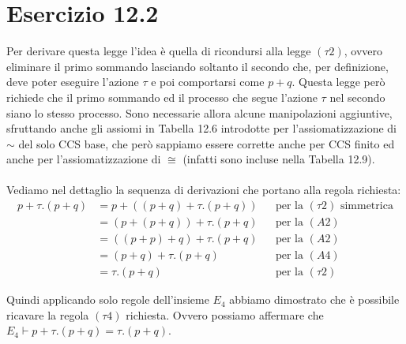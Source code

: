 \section*{Esercizio 12.2}

    
    Per derivare questa legge l'idea è quella di ricondursi alla legge $(\tau 2)$, ovvero eliminare il primo sommando lasciando soltanto il secondo che, per definizione, deve poter eseguire l'azione $\tau$ e poi comportarsi come $p+q$. Questa legge però richiede che il primo sommando ed il processo che segue l'azione $\tau$ nel secondo siano lo stesso processo. Sono necessarie allora alcune manipolazioni aggiuntive, sfruttando anche gli assiomi in Tabella 12.6 introdotte per l'assiomatizzazione di $\sim$ del solo CCS base, che però sappiamo essere corrette anche per CCS finito ed anche per l'assiomatizzazione di $\cong$ (infatti sono incluse nella Tabella 12.9).\\
    \\
    Vediamo nel dettaglio la sequenza di derivazioni che portano alla regola richiesta:
    \begin{align*}
    	p+\tau.(p+q) &= p+((p+q)+\tau.(p+q)) &&\mbox{per la $(\tau 2)$ simmetrica}\\
    	&= (p+(p+q))+\tau.(p+q) &&\mbox{per la $(A2)$}\\
    	&= ((p+p)+q)+\tau.(p+q) &&\mbox{per la $(A2)$}\\
    	&= (p+q)+\tau.(p+q) &&\mbox{per la $(A4)$}\\
    	&= \tau.(p+q) &&\mbox{per la $(\tau 2)$}
    \end{align*}
    
    Quindi applicando solo regole dell'insieme $E_4$ abbiamo dimostrato che è possibile ricavare la regola $(\tau 4)$ richiesta. Ovvero possiamo affermare che $E_4 \vdash p+\tau.(p+q)=\tau.(p+q)$.
